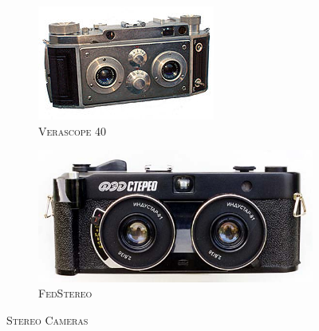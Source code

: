 \begin{figure}[!h]
	\begin{subfigure}[b]{0.4\textwidth}
		\centering
		\includegraphics[width=\textwidth]{project/images/Verascope_40.jpg}
		\caption{\textsc{Verascope 40}}
		\label{fig:1}
	\end{subfigure}
	\hspace{3cm}
	\begin{subfigure}[b]{0.4\textwidth}
		\centering
		\includegraphics[width=\textwidth]{project/images/fedstereo.jpg}
		\caption{\textsc{FedStereo}}
		\label{fig:2}
	\end{subfigure}
	\caption{\textsc{Stereo Cameras}}
\end{figure}



